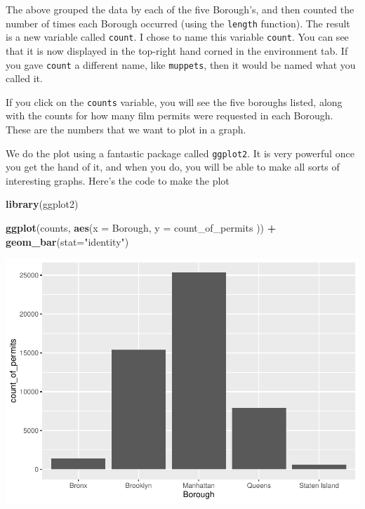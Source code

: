 \documentclass[
]{book}
\newenvironment{Shaded}{\begin{snugshade}}{\end{snugshade}}
\newcommand{\AttributeTok}[1]{\textcolor[rgb]{0.13,0.29,0.53}{#1}}
\newcommand{\FunctionTok}[1]{\textcolor[rgb]{0.13,0.29,0.53}{\textbf{#1}}}
\newcommand{\NormalTok}[1]{#1}
\newcommand{\SpecialCharTok}[1]{\textcolor[rgb]{0.81,0.36,0.00}{\textbf{#1}}}
\newcommand{\StringTok}[1]{\textcolor[rgb]{0.31,0.60,0.02}{#1}}
\begin{document}
The above grouped the data by each of the five Borough's, and then counted the number of times each Borough occurred (using the \texttt{length} function). The result is a new variable called \texttt{count}. I chose to name this variable \texttt{count}. You can see that it is now displayed in the top-right hand corned in the environment tab. If you gave \texttt{count} a different name, like \texttt{muppets}, then it would be named what you called it.

If you click on the \texttt{counts} variable, you will see the five boroughs listed, along with the counts for how many film permits were requested in each Borough. These are the numbers that we want to plot in a graph.

We do the plot using a fantastic package called \texttt{ggplot2}. It is very powerful once you get the hand of it, and when you do, you will be able to make all sorts of interesting graphs. Here's the code to make the plot

\begin{Shaded}
\begin{Highlighting}[]
\FunctionTok{library}\NormalTok{(ggplot2)}

\FunctionTok{ggplot}\NormalTok{(counts, }\FunctionTok{aes}\NormalTok{(}\AttributeTok{x =}\NormalTok{ Borough, }\AttributeTok{y =}\NormalTok{ count\_of\_permits )) }\SpecialCharTok{+}
  \FunctionTok{geom\_bar}\NormalTok{(}\AttributeTok{stat=}\StringTok{"identity"}\NormalTok{)}
\end{Highlighting}
\end{Shaded}

\includegraphics{Statistics_Lab_files/figure-latex/1borough-1.pdf}
\end{document}
